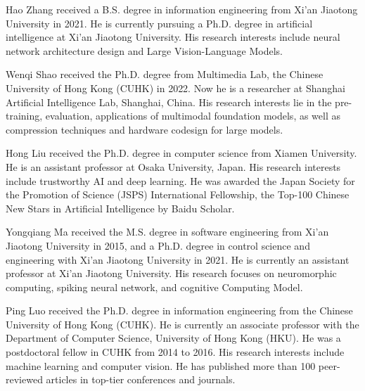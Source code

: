 \normalem

\begin{IEEEbiography}
{Hao Zhang} received a B.S. degree in information engineering from Xi’an Jiaotong University in 2021. He is currently pursuing a Ph.D. degree in artificial intelligence at Xi’an Jiaotong University. His research interests include neural network architecture design and Large Vision-Language Models.
\end{IEEEbiography}

\begin{IEEEbiography}
{Wenqi Shao} received the Ph.D. degree from Multimedia Lab, the Chinese University of Hong Kong (CUHK) in 2022. 
Now he is a researcher at Shanghai Artificial Intelligence Lab, Shanghai, China.
His research interests lie in the pre-training, evaluation, applications of multimodal foundation models, as well as compression techniques and hardware codesign for large models.
\end{IEEEbiography}

\begin{IEEEbiography}
{Hong Liu} received the Ph.D. degree in computer science from Xiamen University. He is an assistant professor at Osaka University, Japan. His research interests include trustworthy AI and deep learning. He was awarded the Japan Society for the Promotion of Science (JSPS) International Fellowship, the Top-100 Chinese New Stars in Artificial Intelligence by Baidu Scholar.
\end{IEEEbiography}

\begin{IEEEbiography}
{Yongqiang Ma} received the M.S. degree in software engineering from Xi'an Jiaotong University in 2015, and a Ph.D. degree in control science and engineering with Xi'an Jiaotong University in 2021. He
is currently an assistant professor at Xi'an Jiaotong University. His research focuses on neuromorphic computing, spiking neural network, and cognitive Computing Model.
\end{IEEEbiography}

\begin{IEEEbiography}
{Ping Luo} received the Ph.D. degree in information engineering from the Chinese University of Hong Kong (CUHK).
He is currently an associate professor with the Department of Computer Science, University of Hong Kong (HKU). He was a postdoctoral fellow in CUHK
from 2014 to 2016. His research interests include machine learning and computer vision. He has published more than 100 peer-reviewed articles in top-tier conferences and journals.
\end{IEEEbiography}

